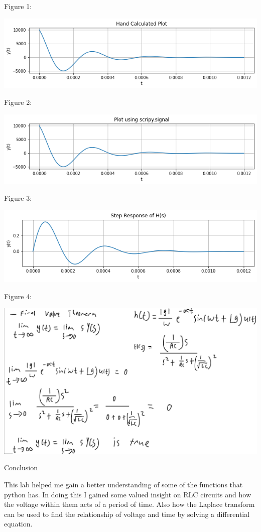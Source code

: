 \documentclass[nobib]{MSword}
\begin{document}
Figure 1:

\includegraphics[scale = 0.50]
{txt/Lab5Fig1.png}

Figure 2:

\includegraphics[scale = 0.75]
{txt/Lab5Fig2.png}

Figure 3:

\includegraphics[scale = 0.75]
{txt/Lab5Fig3.png}

Figure 4:

\includegraphics[scale = 0.2]
{txt/Lab5Fig4.jpeg}

\begin{center}
    Conclusion
\end{center}
This lab helped me gain a better understanding of some of the functions that python has. In doing this I gained some valued insight on RLC circuits and how the voltage within them acts of a period of time. Also how the Laplace transform can be used to find the relationship of voltage and time by solving a differential equation.
\end{document}
